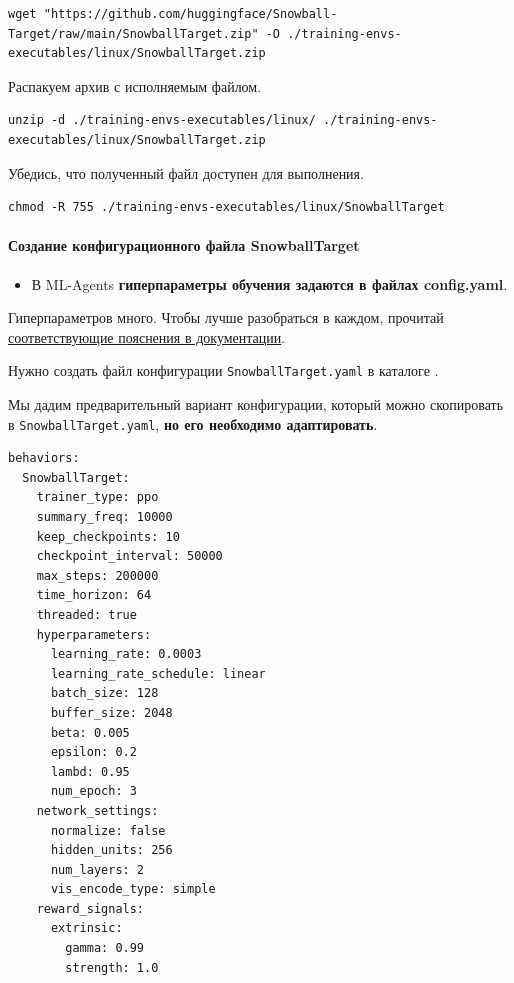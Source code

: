 \documentclass[11pt,a4paper]{article}
\begin{document}
\begin{lstlisting}
wget "https://github.com/huggingface/Snowball-Target/raw/main/SnowballTarget.zip" -O ./training-envs-executables/linux/SnowballTarget.zip
\end{lstlisting}

Распакуем архив с исполняемым файлом.

\begin{lstlisting}
unzip -d ./training-envs-executables/linux/ ./training-envs-executables/linux/SnowballTarget.zip
\end{lstlisting}

Убедись, что полученный файл доступен для выполнения.

\begin{lstlisting}
chmod -R 755 ./training-envs-executables/linux/SnowballTarget
\end{lstlisting}

\paragraph{Создание конфигурационного файла SnowballTarget}\label{define-the-snowballtarget-config-file}

\begin{itemize}
\tightlist
\item
  В ML-Agents \textbf{гиперпараметры обучения задаются в файлах config.yaml}.
\end{itemize}

Гиперпараметров много. Чтобы лучше разобраться в каждом, прочитай \href{https://github.com/Unity-Technologies/ml-agents/blob/release_20_docs/docs/Training-Configuration-File.md}{соответствующие пояснения в документации}.

Нужно создать файл конфигурации \texttt{SnowballTarget.yaml} в каталоге .

Мы дадим предварительный вариант конфигурации, который можно скопировать в \texttt{SnowballTarget.yaml}, \textbf{но его необходимо адаптировать}.

\begin{lstlisting}
behaviors:
  SnowballTarget:
    trainer_type: ppo
    summary_freq: 10000
    keep_checkpoints: 10
    checkpoint_interval: 50000
    max_steps: 200000
    time_horizon: 64
    threaded: true
    hyperparameters:
      learning_rate: 0.0003
      learning_rate_schedule: linear
      batch_size: 128
      buffer_size: 2048
      beta: 0.005
      epsilon: 0.2
      lambd: 0.95
      num_epoch: 3
    network_settings:
      normalize: false
      hidden_units: 256
      num_layers: 2
      vis_encode_type: simple
    reward_signals:
      extrinsic:
        gamma: 0.99
        strength: 1.0
\end{lstlisting}
\end{document}
